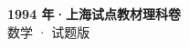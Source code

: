 \documentclass[zihao=-4, a4paper]{ctexart}
\begin{document}
\begin{center}
  {\Large\bfseries 1994 年·上海试点教材理科卷}\\[4pt]
  {\large 数学 · 试题版}
\end{center}
\medskip
{}

\end{document}
